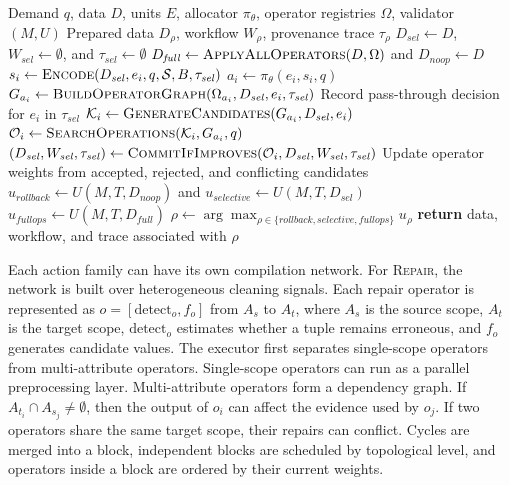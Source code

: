 \documentclass[sigconf, nonacm]{acmart}
\newcommand{\noop}{\textsc{No-op}\xspace}
\newcommand{\repair}{\textsc{Repair}\xspace}
\begin{document}
\begin{algorithm}[t]
\caption{Inference-Time Action-Workflow Execution}
\label{alg:operator-execution}
\vspace{-1mm}
\small
\begin{algorithmic}[1]
\REQUIRE Demand $q$, data $D$, units $E$, allocator $\pi_\theta$, operator registries $\Omega$, validator $(M,U)$
\ENSURE Prepared data $D_{\rho}$, workflow $W_{\rho}$, provenance trace $\tau_{\rho}$
\STATE $D_{\mathit{sel}}\leftarrow D$, $W_{\mathit{sel}}\leftarrow\emptyset$, and $\tau_{\mathit{sel}}\leftarrow\emptyset$
\STATE $D_{\mathit{full}}\leftarrow\textsc{ApplyAllOperators}(D,\Omega)$ and $D_{\mathit{noop}}\leftarrow D$
    \STATE $s_i\leftarrow\textsc{Encode}(D_{\mathit{sel}},e_i,q,\mathcal{S},B,\tau_{\mathit{sel}})$
    \STATE $a_i\leftarrow\pi_\theta(e_i,s_i,q)$
    \STATE $G_{a_i}\leftarrow\textsc{BuildOperatorGraph}(\Omega_{a_i},D_{\mathit{sel}},e_i,\tau_{\mathit{sel}})$
    \IF{$a_i=\noop$}
        \STATE Record pass-through decision for $e_i$ in $\tau_{\mathit{sel}}$
    \ELSE
        \STATE $\mathcal{K}_i\leftarrow\textsc{GenerateCandidates}(G_{a_i},D_{\mathit{sel}},e_i)$
        \STATE $\mathcal{O}_i\leftarrow\textsc{SearchOperations}(\mathcal{K}_i,G_{a_i},q)$
        \STATE $(D_{\mathit{sel}},W_{\mathit{sel}},\tau_{\mathit{sel}})\leftarrow\textsc{CommitIfImproves}(\mathcal{O}_i,D_{\mathit{sel}},W_{\mathit{sel}},\tau_{\mathit{sel}})$
        \STATE Update operator weights from accepted, rejected, and conflicting candidates
    \ENDIF
\ENDFOR
\STATE $u_{\mathit{rollback}}\leftarrow U(M,T,D_{\mathit{noop}})$ and $u_{\mathit{selective}}\leftarrow U(M,T,D_{\mathit{sel}})$
\STATE $u_{\mathit{fullops}}\leftarrow U(M,T,D_{\mathit{full}})$
\STATE $\rho\leftarrow\arg\max_{\rho\in\{\mathit{rollback},\mathit{selective},\mathit{fullops}\}} u_{\rho}$
\STATE \textbf{return} data, workflow, and trace associated with $\rho$
\end{algorithmic}
\vspace{-1mm}
\end{algorithm}

Each action family can have its own compilation network. For \repair, the network is built over heterogeneous cleaning signals. Each repair operator is represented as $o=[\mathrm{detect}_o,f_o]$ from $A_s$ to $A_t$, where $A_s$ is the source scope, $A_t$ is the target scope, $\mathrm{detect}_o$ estimates whether a tuple remains erroneous, and $f_o$ generates candidate values. The executor first separates single-scope operators from multi-attribute operators. Single-scope operators can run as a parallel preprocessing layer. Multi-attribute operators form a dependency graph. If $A_{t_i}\cap A_{s_j}\neq\emptyset$, then the output of $o_i$ can affect the evidence used by $o_j$. If two operators share the same target scope, their repairs can conflict. Cycles are merged into a block, independent blocks are scheduled by topological level, and operators inside a block are ordered by their current weights.
\end{document}
